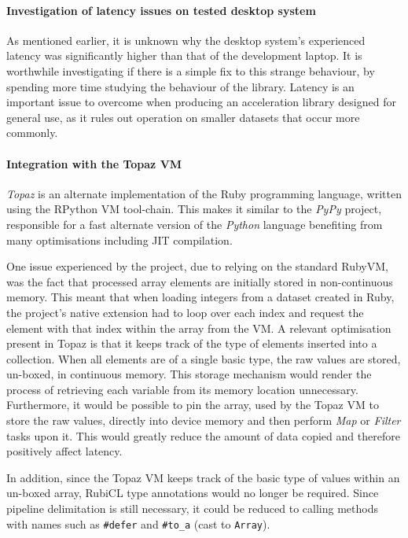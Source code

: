 \paragraph*{Investigation of latency issues on tested desktop system} As mentioned earlier, it is unknown why the desktop system's experienced latency was significantly higher than that of the development laptop. It is worthwhile investigating if there is a simple fix to this strange behaviour, by spending more time studying the behaviour of the library. Latency is an important issue to overcome when producing an acceleration library designed for general use, as it rules out operation on smaller datasets that occur more commonly.

\paragraph*{Integration with the Topaz VM}
\emph{Topaz}\cite{topaz} is an alternate implementation of the Ruby programming language, written using the RPython VM tool-chain. This makes it similar to the \emph{PyPy} project, responsible for a fast alternate version of the \emph{Python} language benefiting from many optimisations including \ac{JIT} compilation.

One issue experienced by the project, due to relying on the standard RubyVM, was the fact that processed array elements are initially stored in non-continuous memory. This meant that when loading integers from a dataset created in Ruby, the project's native extension had to loop over each index and request the element with that index within the array from the VM. A relevant optimisation present in Topaz is that it keeps track of the type of elements inserted into a collection. When all elements are of a single basic type, the raw values are stored, un-boxed, in continuous memory. This storage mechanism would render the process of retrieving each variable from its memory location unnecessary. Furthermore, it would be possible to pin the array, used by the Topaz VM to store the raw values, directly into device memory and then perform \emph{Map} or \emph{Filter} tasks upon it. This would greatly reduce the amount of data copied and therefore positively affect latency.

In addition, since the Topaz VM keeps track of the basic type of values within an un-boxed array, RubiCL type annotations would no longer be required. Since pipeline delimitation is still necessary, it could be reduced to calling methods with names such as \verb|#defer| and \verb|#to_a| (cast to \verb|Array|).

